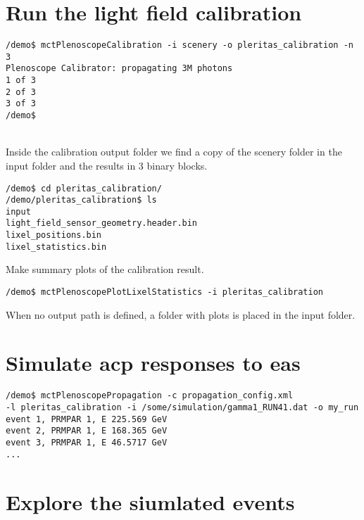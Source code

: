 \section{Run the light field calibration}
%
\begin{minipage}{\linewidth}%
\begin{lstlisting}[style=MctBash]
/demo$ mctPlenoscopeCalibration -i scenery -o pleritas_calibration -n 3
Plenoscope Calibrator: propagating 3M photons
1 of 3
2 of 3
3 of 3
/demo$ 
\end{lstlisting}
\end{minipage}\\
%
Inside the calibration output folder we find a copy of the scenery folder in the input folder and the results in 3 binary blocks.\\
%
\begin{minipage}{\linewidth}%
\begin{lstlisting}[style=MctBash]
/demo$ cd pleritas_calibration/
/demo/pleritas_calibration$ ls
input  
light_field_sensor_geometry.header.bin  
lixel_positions.bin  
lixel_statistics.bin
\end{lstlisting}
\end{minipage}%
%
Make summary plots of the calibration result.
\begin{minipage}{\linewidth}%
\begin{lstlisting}[style=MctBash]
/demo$ mctPlenoscopePlotLixelStatistics -i pleritas_calibration
\end{lstlisting}
\end{minipage}%
%
When no output path is defined, a folder with plots is placed in the input folder.
%
\section{Simulate \ac{acp} responses to \ac{eas}}
%
\begin{lstlisting}[style=MctBash]
/demo$ mctPlenoscopePropagation -c propagation_config.xml 
-l pleritas_calibration -i /some/simulation/gamma1_RUN41.dat -o my_run
event 1, PRMPAR 1, E 225.569 GeV
event 2, PRMPAR 1, E 168.365 GeV
event 3, PRMPAR 1, E 46.5717 GeV
...
\end{lstlisting}
\section{Explore the siumlated events}

